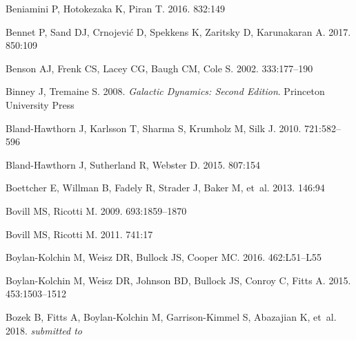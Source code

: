 \documentclass[a4paper]{ar-1col}
\begin{document}
\begin{thebibliography}{}
{Beniamini} P, {Hotokezaka} K, {Piran} T. 2016{}.
\textit{\apj} 832:149

{Bennet} P, {Sand} DJ, {Crnojevi{\'c}} D, {Spekkens} K, {Zaritsky} D,
  {Karunakaran} A. 2017.
\textit{\apj} 850:109

{Benson} AJ, {Frenk} CS, {Lacey} CG, {Baugh} CM, {Cole} S. 2002.
\textit{\mnras} 333:177--190

{Binney} J, {Tremaine} S. 2008.
\textit{{Galactic Dynamics: Second Edition}}.
Princeton University Press

{Bland-Hawthorn} J, {Karlsson} T, {Sharma} S, {Krumholz} M, {Silk} J. 2010.
\textit{\apj} 721:582--596

{Bland-Hawthorn} J, {Sutherland} R, {Webster} D. 2015.
\textit{\apj} 807:154

{Boettcher} E, {Willman} B, {Fadely} R, {Strader} J, {Baker} M, et~al. 2013.
\textit{\aj} 146:94

{Bovill} MS, {Ricotti} M. 2009.
\textit{\apj} 693:1859--1870

{Bovill} MS, {Ricotti} M. 2011.
\textit{\apj} 741:17

{Boylan-Kolchin} M, {Weisz} DR, {Bullock} JS, {Cooper} MC. 2016.
\textit{\mnras} 462:L51--L55

{Boylan-Kolchin} M, {Weisz} DR, {Johnson} BD, {Bullock} JS, {Conroy} C, {Fitts}
  A. 2015.
\textit{\mnras} 453:1503--1512

{Bozek} B, {Fitts} A, {Boylan-Kolchin} M, {Garrison-Kimmel} S, {Abazajian} K,
  et~al. 2018.
\textit{submitted to \mnras}


\end{thebibliography}
\end{document}
